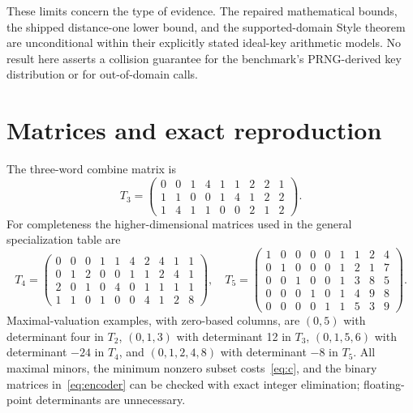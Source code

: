 These limits concern the type of evidence. The repaired mathematical bounds, the shipped distance-one lower bound, and the supported-domain Style theorem are unconditional within their explicitly stated ideal-key arithmetic models. No result here asserts a collision guarantee for the benchmark's PRNG-derived key distribution or for out-of-domain calls.

\appendix
\section{Matrices and exact reproduction}\label{app:reproduce}
The three-word combine matrix is
\[
 T_3=\begin{pmatrix}
 0&0&1&4&1&1&2&2&1\\
 1&1&0&0&1&4&1&2&2\\
 1&4&1&1&0&0&2&1&2
 \end{pmatrix}.
\]
For completeness the higher-dimensional matrices used in the general specialization table are
\[
 T_4=\begin{pmatrix}
 0&0&0&1&1&4&2&4&1&1\\
 0&1&2&0&0&1&1&2&4&1\\
 2&0&1&0&4&0&1&1&1&1\\
 1&1&0&1&0&0&4&1&2&8
 \end{pmatrix},\quad
 T_5=\begin{pmatrix}
 1&0&0&0&0&1&1&2&4\\
 0&1&0&0&0&1&2&1&7\\
 0&0&1&0&0&1&3&8&5\\
 0&0&0&1&0&1&4&9&8\\
 0&0&0&0&1&1&5&3&9
 \end{pmatrix}.
\]
Maximal-valuation examples, with zero-based columns, are $(0,5)$ with determinant four in $T_2$, $(0,1,3)$ with determinant 12 in $T_3$, $(0,1,5,6)$ with determinant $-24$ in $T_4$, and $(0,1,2,4,8)$ with determinant $-8$ in $T_5$. All maximal minors, the minimum nonzero subset costs~\eqref{eq:c}, and the binary matrices in~\eqref{eq:encoder} can be checked with exact integer elimination; floating-point determinants are unnecessary.

